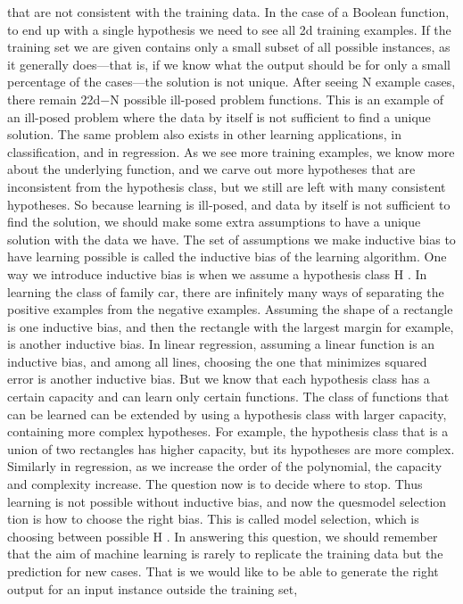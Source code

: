 that are not consistent with the training data. In the case of a Boolean function, to end up with a single hypothesis we need to see all 2d training examples. If the training set we are given contains only a small subset of all possible instances, as it generally does---that is, if we know what the output should be for only a small percentage of the cases---the solution is not unique. After seeing N example cases, there remain 22d$-$N possible ill-posed problem functions. This is an example of an ill-posed problem where the data by itself is not sufficient to find a unique solution. The same problem also exists in other learning applications, in classification, and in regression. As we see more training examples, we know more about the underlying function, and we carve out more hypotheses that are inconsistent from the hypothesis class, but we still are left with many consistent hypotheses. So because learning is ill-posed, and data by itself is not sufficient to find the solution, we should make some extra assumptions to have a unique solution with the data we have. The set of assumptions we make inductive bias to have learning possible is called the inductive bias of the learning algorithm. One way we introduce inductive bias is when we assume a hypothesis class H . In learning the class of family car, there are infinitely many ways of separating the positive examples from the negative examples. Assuming the shape of a rectangle is one inductive bias, and then the rectangle with the largest margin for example, is another inductive bias. In linear regression, assuming a linear function is an inductive bias, and among all lines, choosing the one that minimizes squared error is another inductive bias. But we know that each hypothesis class has a certain capacity and can learn only certain functions. The class of functions that can be learned can be extended by using a hypothesis class with larger capacity, containing more complex hypotheses. For example, the hypothesis class that is a union of two rectangles has higher capacity, but its hypotheses are more complex. Similarly in regression, as we increase the order of the polynomial, the capacity and complexity increase. The question now is to decide where to stop. Thus learning is not possible without inductive bias, and now the quesmodel selection tion is how to choose the right bias. This is called model selection, which is choosing between possible H . In answering this question, we should remember that the aim of machine learning is rarely to replicate the training data but the prediction for new cases. That is we would like to be able to generate the right output for an input instance outside the training set,


